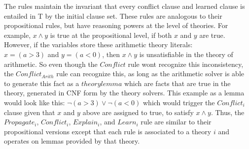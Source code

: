 \documentclass{article}
\begin{document}
The rules maintain the invariant that every conflict clause and learned 
clause is entailed in T by the initial clause set.
These rules are analogous to their propositional rules, but 
have reasoning powers at the level of theories. For example, 
$x \land y$ is true at the propositional level, if both 
$x$ and $y$ are true. However, if the variables store these 
arithmetic theory literals: \\
$x = (a > 3)$ and $y = (a < 0)$, then $x \land y$ is 
unsatisfiable in the theory of arithmetic. So even though 
the $Conflict$ rule wont recognize this inconsistency, 
the $Conflict_{Arith}$ rule can recognize this, as long as 
the arithmetic solver is able to generate this fact as a 
$theory lemma$ which are facts that are true in the theory, 
generated in CNF form by the theory solvers. This example
as a lemma would look like this:
$\neg (a > 3) \lor \neg (a < 0)$ which would trigger the 
$Conflict_i$ clause given that $x$ and $y$ above are assigned 
to true, to satisfy $x \land y$. Thus, the $Propagate_i$, 
$Conflict_i$, $Explain_i$, and $Learn_i$ rule are similar 
to their propositional versions except that each rule is 
associated to a theory $i$ and operates on lemmas 
provided by that theory. 
\end{document}
